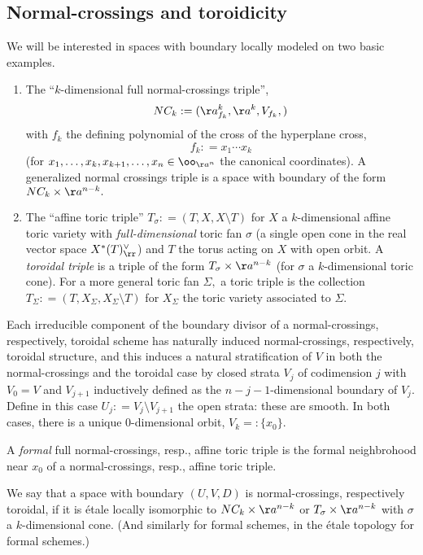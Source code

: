 \documentclass{article}
\begin{document}
\subsection{Normal-crossings and toroidicity}
We will be interested in spaces with boundary locally modeled on two basic examples.
\begin{enumerate}
\item The ``$k$-dimensional full normal-crossings triple'', $$NC_k : = (\aa^k_{f_k}, \aa^k, V_{f_k},)$$ with $f_k$ the defining polynomial of the cross of the hyperplane cross, $$f_k : = x_1\cdots x_k$$ (for $x_1, \dots, x_k, x_{k+1}, \dots, x_n\in \oo_{\aa^n}$ the canonical coordinates). A generalized normal crossings triple is a space with boundary of the form $NC_k \times \aa^{n-k}.$ 
\item The ``affine toric triple'' $T_\sigma : = (T, X, X\setminus T)$ for $X$ a $k$-dimensional affine toric variety with \emph{full-dimensional} toric fan $\sigma$ (a single open cone in the real vector space $X^*(T)^\vee_\rr$) and $T$ the torus acting on $X$ with open orbit. A \emph{toroidal triple} is a triple of the form $T_\sigma\times \aa^{n-k}$ (for $\sigma$ a $k$-dimensional toric cone). For a more general toric fan $\Sigma,$ a toric triple is the collection $T_\Sigma: = (T, X_\Sigma, X_\Sigma\setminus T)$ for $X_\Sigma$ the toric variety associated to $\Sigma.$
\end{enumerate}
Each irreducible component of the boundary divisor of a normal-crossings, respectively, toroidal scheme has naturally induced normal-crossings, respectively, toroidal structure, and this induces a natural stratification of $V$ in both the normal-crossings and the toroidal case by closed strata $V_j$ of codimension $j$ with $V_0 = V$ and $V_{j+1}$ inductively defined as the $n-j-1$-dimensional boundary of $V_j$. Define in this case $U_j : = V_j\setminus V_{j+1}$ the open strata: these are smooth. In both cases, there is a unique $0$-dimensional orbit, $V_k = : \{x_0\}$. 

\begin{defi} A \emph{formal} full normal-crossings, resp., affine toric triple is the formal neighbrohood near $x_0$ of a normal-crossings, resp., affine toric triple.
\end{defi}
\begin{defi}
 We say that a space with boundary $(U, V, D)$ is normal-crossings, respectively toroidal, if it is \'etale locally isomorphic to $NC_k\times \aa^{n-k}$ or $T_\sigma\times \aa^{n-k}$ with $\sigma$ a $k$-dimensional cone. (And similarly for formal schemes, in the \'etale topology for formal schemes.)
\end{defi}
\end{document}
